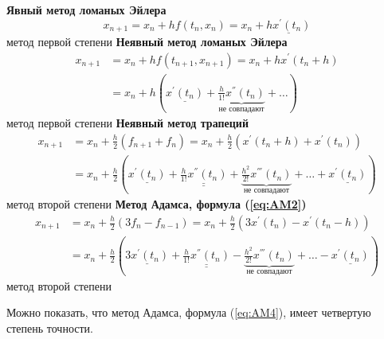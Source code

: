 \documentclass[a4paper,11pt]{article}
\begin{document}
\begin{importantblock}
  \begin{center}
    \textbf{Явный метод ломаных Эйлера}
    \[x_{n+1} = x_n + hf(t_n, x_n) = x_n + \underline{hx^{'}(t_n)}\]
    \small{метод первой степени}
    \textbf{Неявный метод ломаных Эйлера}
    \begin{align*}
      x_{n+1} &= x_n + hf(t_{n+1}, x_{n+1}) = x_n + hx^{'}(t_n + h) \\
              &= x_n + h(\underline{x^{'}(t_n)} + \underbrace{\frac{h}{1!}x^{''}(t_n)}_{\text{не совпадают}} + \dots)
    \end{align*}
    \small{метод первой степени}
    \textbf{Неявный метод трапеций}
    \begin{align*}
      x_{n+1} &= x_n + \frac{h}{2}(f_{n+1} + f_n) = x_n + \frac{h}{2}(x^{'}(t_n+h)+x^{'}(t_n)) \\
              &= x_n + \frac{h}{2}(\underline{x^{'}(t_n)} + \underline{\underline{\frac{h}{1!}x^{''}(t_n)}} + \underbrace{\frac{h^2}{2!}x^{'''}(t_n)}_{\text{не совпадают}} + \dots + \underline{x^{'}(t_n)})
    \end{align*}
    \small{метод второй степени}
    \textbf{Метод Адамса, формула (\ref{eq:AM2})}
    \begin{align*}
      x_{n+1} &= x_n + \frac{h}{2}(3f_n - f_{n-1}) = x_n + \frac{h}{2}(3x^{'}(t_n)-x^{'}(t_n-h)) \\
              &= x_n + \frac{h}{2}(\underline{3x^{'}(t_n)} + \underline{\underline{\frac{h}{1!}x^{''}(t_n)}} - \underbrace{\frac{h^2}{2!}x^{'''}(t_n)}_{\text{не совпадают}} + \dots - \underline{x^{'}(t_n)})
    \end{align*}
    \small{метод второй степени}
  \end{center}
  Можно показать, что метод Адамса, формула (\ref{eq:AM4}), имеет четвертую степень точности.
\end{importantblock}
\end{document}
